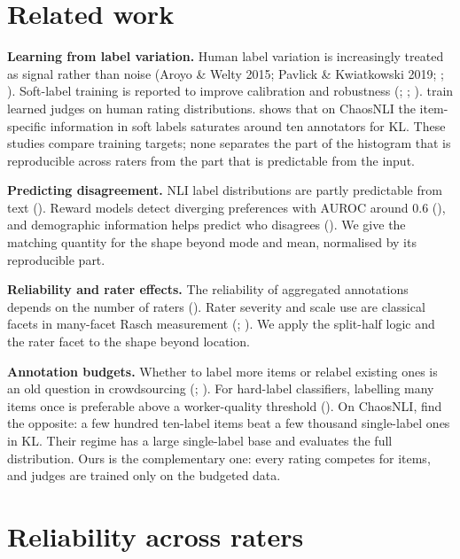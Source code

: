 \documentclass{article}
\begin{document}
\section{Related work}

\textbf{Learning from label variation.} Human label variation is increasingly treated as signal rather than noise (Aroyo \& Welty 2015; Pavlick \& Kwiatkowski 2019; \citealp{uma2021learning}; \citealp{plank2022problem}). Soft-label training is reported to improve calibration and robustness (\citealp{peterson2019human}; \citealp{collins2022eliciting}; \citealp{singh2025distributions}). \citet{chen2025beyond} train learned judges on human rating distributions. \citet{kohli2026metric} shows that on ChaosNLI the item-specific information in soft labels saturates around ten annotators for KL. These studies compare training targets; none separates the part of the histogram that is reproducible across raters from the part that is predictable from the input.

\textbf{Predicting disagreement.} NLI label distributions are partly predictable from text (\citealp{zhou2022distributed}). Reward models detect diverging preferences with AUROC around 0.6 (\citealp{zhang2025diverging}), and demographic information helps predict who disagrees (\citealp{wan2023everyone}). We give the matching quantity for the shape beyond mode and mean, normalised by its reproducible part.

\textbf{Reliability and rater effects.} The reliability of aggregated annotations depends on the number of raters (\citealp{wong2022krater}). Rater severity and scale use are classical facets in many-facet Rasch measurement (\citealp{linacre1989mfrm}; \citealp{eckes2011mfrm}). We apply the split-half logic and the rater facet to the shape beyond location.

\textbf{Annotation budgets.} Whether to label more items or relabel existing ones is an old question in crowdsourcing (\citealp{sheng2008get}; \citealp{lin2014relabel}). For hard-label classifiers, labelling many items once is preferable above a worker-quality threshold (\citealp{khetan2018learning}). On ChaosNLI, \citet{zhang2021learning} find the opposite: a few hundred ten-label items beat a few thousand single-label ones in KL. Their regime has a large single-label base and evaluates the full distribution. Ours is the complementary one: every rating competes for items, and judges are trained only on the budgeted data.

\section{Reliability across raters}


\end{document}
